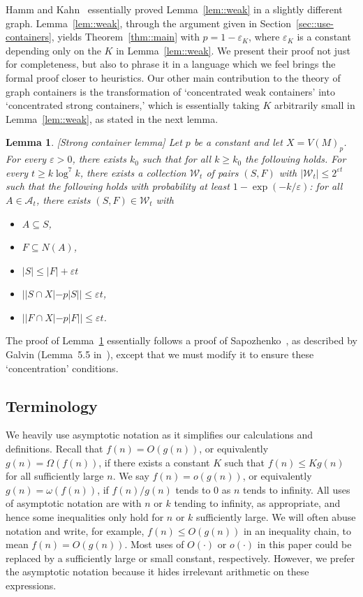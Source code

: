 \documentclass[12pt]{article}
\newcommand{\ep}{\varepsilon}
\newcommand{\A}{\mathcal{A}}
\newtheorem{lemma}[theorem]{Lemma}
\begin{document}
Hamm and Kahn~\cite{HK2} essentially proved Lemma~\ref{lem::weak} in a slightly different graph. Lemma~\ref{lem::weak}, through the argument given in Section~\ref{sec::use-containers}, yields Theorem~\ref{thm::main} with $p = 1-\ep_K$, where $\ep_K$ is a constant depending only on the $K$ in Lemma~\ref{lem::weak}. We present their proof not just for completeness, but also to phrase it in a language which we feel brings the formal proof closer to heuristics. Our other main contribution to the theory of graph containers is the transformation of `concentrated weak containers' into `concentrated strong containers,' which is essentially taking $K$ arbitrarily small in Lemma~\ref{lem::weak}, as stated in the next lemma.
\begin{lemma}\label{lem::strong}[Strong container lemma]
Let $p$ be a constant and let $X = V(M)_p$. For every $\ep > 0$, there exists $k_0$ such that for all $k \geq k_0$ the following holds. For every $t \geq k \log^7 k$, there exists a collection $\mathcal{W}_t$ of pairs $(S,F)$ with $|\mathcal{W}_t| \leq 2^{\ep t}$ such that the following holds with probability at least $1-\exp(-k/\ep)$: for all $A \in \A_t$, there exists $(S,F) \in \mathcal{W}_t$ with
\begin{itemize}
\item $A \subseteq S$,
\item $F \subseteq N(A)$,
\item $|S| \leq |F| + \ep t$
\item $||S \cap X|-p|S|| \leq \ep t$,
\item $||F \cap X|-p|F|| \leq \ep t$.
\end{itemize}
\end{lemma}
The proof of Lemma~\ref{lem::strong} essentially follows a proof of Sapozhenko~\cite{Sap}, as described by Galvin (Lemma~5.5 in~\cite{Galvin}), except that we must modify it to ensure these `concentration' conditions.


\subsection{Terminology}\label{sec::intro:terms}

We heavily use asymptotic notation as it simplifies our calculations and definitions. Recall that $f(n) = O(g(n))$, or equivalently $g(n) = \Omega(f(n))$, if there exists a constant $K$ such that $f(n) \leq Kg(n)$ for all sufficiently large $n$. We say $f(n) = o(g(n))$, or equivalently $g(n) = \omega(f(n))$, if $f(n)/g(n)$ tends to $0$ as $n$ tends to infinity. All uses of asymptotic notation are with $n$ or $k$ tending to infinity, as appropriate, and hence some inequalities only hold for $n$ or $k$ sufficiently large. We will often abuse notation and write, for example, $f(n) \leq O(g(n))$ in an inequality chain, to mean $f(n) = O(g(n))$. Most uses of $O(\cdot)$ or $o(\cdot)$ in this paper could be replaced by a sufficiently large or small constant, respectively. However, we prefer the asymptotic notation because it hides irrelevant arithmetic on these expressions. 
\end{document}
